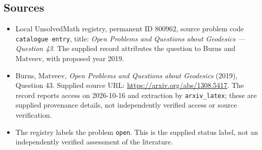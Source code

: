 \documentclass[11pt]{article}
\begin{document}
\subsection{Sources}
\begin{itemize}
\item Local UnsolvedMath registry, permanent ID \(800962\), source problem code \texttt{catalogue entry}, title: \emph{Open Problems and Questions about Geodesics --- Question 43}. The supplied record attributes the question to Burns and Matveev, with proposed year 2019.
\item Burns, Matveev, \emph{Open Problems and Questions about Geodesics} (2019), Question 43. Supplied source URL: \url{https://arxiv.org/abs/1308.5417}. The record reports access on 2026-10-16 and extraction by \texttt{arxiv\_latex}; these are supplied provenance details, not independently verified access or source verification.
\item The registry labels the problem \texttt{open}. This is the supplied status label, not an independently verified assessment of the literature.
\end{itemize}
\end{document}

